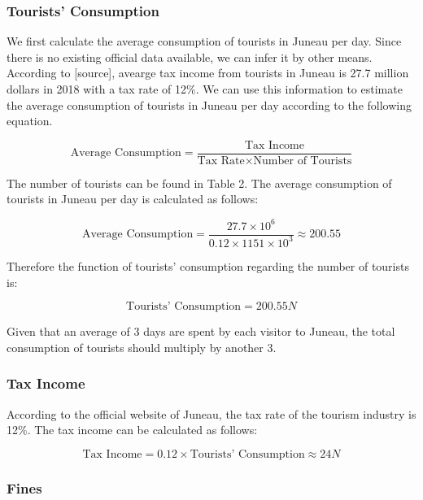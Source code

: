 \subsubsection{Tourists' Consumption}

We first calculate the average consumption of tourists in Juneau per day. Since there is no existing official data available, 
we can infer it by other means. According to [source], avearge tax income from tourists in Juneau is 27.7 million dollars in 2018
with a tax rate of 12\%. We can use this information to estimate the average consumption of tourists in Juneau per day according to 
the following equation.

\begin{equation}
    \text{Average Consumption} = \frac{\text{Tax Income}}{\text{Tax Rate} \times \text{Number of Tourists}}
\end{equation}

The number of tourists can be found in Table 2. The average consumption of 
tourists in Juneau per day is calculated as follows:

\begin{equation}
    \text{Average Consumption} = \frac{27.7 \times 10^6}{0.12 \times 1151 \times 10^3} \approx 200.55
\end{equation}

Therefore the function of tourists' consumption regarding the number of tourists is:


\begin{equation}
    \text{Tourists' Consumption} = 200.55 N
\end{equation}

Given that an average of 3 days are spent by each visitor to Juneau, 
the total consumption of tourists should multiply by another 3.

\subsubsection{Tax Income}

According to the official website of Juneau, the tax rate of the tourism industry is 12\%.
The tax income can be calculated as follows:

\begin{equation}
    \text{Tax Income} = 0.12 \times \text{Tourists' Consumption} \approx 24 N
\end{equation}

\subsubsection{Fines}

